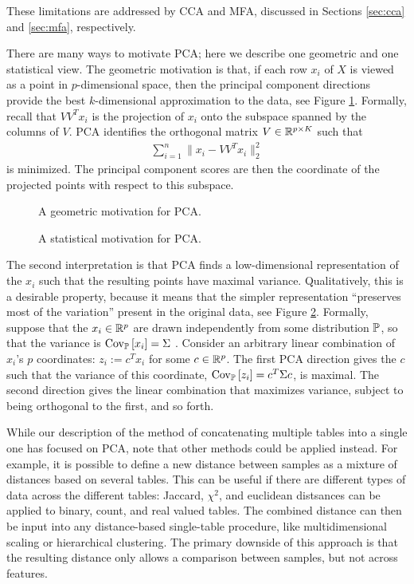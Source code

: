 \documentclass{article}
\begin{document}
These limitations are addressed by CCA and MFA, discussed in Sections
\ref{sec:cca} and \ref{sec:mfa}, respectively.

There are many ways to motivate PCA; here we describe one geometric
and one statistical view. The geometric motivation is that, if each
row $x_{i}$ of $X$ is viewed as a point in $p$-dimensional space, then
the principal component directions provide the best $k$-dimensional
approximation to the data, see Figure \ref{fig:pca-approx}. Formally,
recall that $VV^{T}x_{i}$ is the projection of $x_{i}$ onto the
subspace spanned by the columns of $V$. PCA identifies the orthogonal
matrix $V \in \reals^{p \times K}$ such that
\begin{align}
\sum_{i = 1}^{n}\|x_{i} - VV^{T} x_{i}\|_{2}^{2}
\end{align}
is minimized. The principal component scores are then the coordinate
of the projected points with respect to this subspace.

\begin{figure}
  \caption{A geometric motivation for PCA.}
  \label{fig:pca-approx}
\end{figure}

\begin{figure}
  \caption{A statistical motivation for PCA.}
  \label{fig:pca-var}
\end{figure}

The second interpretation is that PCA finds a low-dimensional
representation of the $x_{i}$ such that the resulting points have
maximal variance. Qualitatively, this is a desirable
property, because it means that the simpler representation
``preserves most of the variation'' present in the original
data, see Figure \ref{fig:pca-var}. Formally, suppose that the
$x_{i}\in\reals^{p}$ are drawn independently from some distribution
$\P$, so that the variance is $\Covsubarg{\P}{x_{i}} = \Sigma$
. Consider an arbitrary linear combination of $x_{i}$'s $p$
coordinates: $z_{i} := c^{T}x_{i}$ for some $c \in \reals^{p}$. The
first PCA direction gives the $c$ such that the variance of this
coordinate, $\Covsubarg{\P}{z_{i}} = c^{T}\Sigma c$, is maximal. The
second direction gives the linear combination that maximizes variance,
subject to being orthogonal to the first, and so forth.

While our description of the method of concatenating multiple tables
into a single one has focused on PCA, note that other
methods could be applied instead. For example, it is possible to define a new
distance between samples as a mixture of distances based on several
tables. This can be useful if there are different types of data across
the different tables: Jaccard, $\chi^{2}$, and euclidean distsances
can be applied to binary, count, and real valued tables. The combined
distance can then be input into any distance-based single-table
procedure, like multidimensional scaling or hierarchical
clustering. The primary downside of this approach is that the
resulting distance only allows a comparison between samples, but not
across features.
\end{document}
